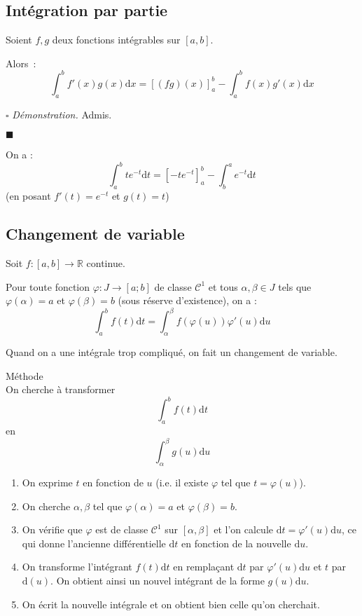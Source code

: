 \documentclass[a4paper, titlepage]{article}
\newenvironment{lititle}%
{\vspace{7mm}\LobsterTwo \large}%
{\\}
\renewenvironment{proof}{$\square$ \footnotesize\textit{Démonstration.}}{\begin{flushright}$\blacksquare$\end{flushright}}
\begin{document}
	\subsection{Intégration par partie}
	\begin{thm}[IPP]
		Soient $f,g$ deux fonctions intégrables sur $[a,b]$.

		Alors~:
		$$ \int_a^b f'(x)g(x)\mathrm{d}x = [(fg)(x)]^b_a-\int^b_af(x)g'(x)\mathrm{d}x $$
	\end{thm}
	\begin{proof}
		Admis.
	\end{proof}
	\begin{exemple}
		On a :
		$$ \int_a^b te^{-t}\mathrm{d}t = [-te^{-t}]^b_a-\int^a_be^{-t}\mathrm{d}t $$
		(en posant $f'(t)=e^{-t}$ et $g(t)=t$)
	\end{exemple}
	\subsection{Changement de variable}
	\begin{thm}
		Soit $f:[a,b]\to \mathbb{R}$ continue. 

		Pour toute fonction $\varphi:J\to [a;b]$ de classe $\mathcal{C}^1$ et tous $\alpha,\beta\in J$ tels que $\varphi(\alpha)=a$ et $\varphi(\beta)=b$ (sous réserve d'existence), on a : $$ \int^b_af(t)\mathrm{d}t = \int^{\beta}_{\alpha}f(\varphi(u))\varphi'(u)\mathrm{d}u $$
	\end{thm}
	Quand on a une intégrale trop compliqué, on fait un changement de variable.

	\begin{lititle}
		Méthode
	\end{lititle}
	On cherche à transformer $$ \int^b_a f(t)\mathrm{d}t $$ en $$ \int^{\beta}_{\alpha} g(u)\mathrm{d}u $$
	\begin{enumerate}
		\item On exprime $t$ en fonction de $u$ (i.e. il existe $\varphi$ tel que $t=\varphi(u)$).
		\item On cherche $\alpha,\beta$ tel que $\varphi(\alpha)=a$ et $\varphi(\beta)=b$.
		\item On vérifie que $\varphi$ est de classe $\mathcal{C}^1$ sur $[\alpha,\beta]$ et l’on calcule $\mathrm{d}t = \varphi'(u)\mathrm{d}u$, ce qui donne l’ancienne différentielle $\mathrm{d}t$ en fonction de la nouvelle $\mathrm{d}u$.
		\item On transforme l’intégrant $f(t) \mathrm{d}t$ en remplaçant $\mathrm{d}t$ par $\varphi'(u) \mathrm{d}u$ et $t$ par $\mathrm{d}(u)$. On obtient ainsi un nouvel intégrant de la forme $g(u) \mathrm{d}u$.
		\item On écrit la nouvelle intégrale et on obtient bien celle qu'on cherchait.
	\end{enumerate}
\end{document}
